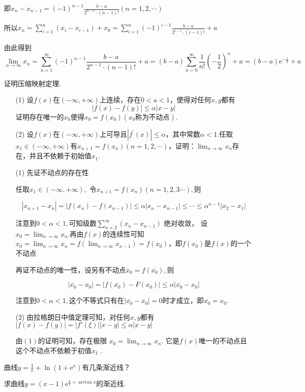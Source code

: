 \begin{xiti}
\begin{solution}
	即$x_{n}-x_{n-1}=(-1)^{n-1} \frac{b-a}{2^{n-1} \cdot(n-1) !}(n=1,2, \cdots)$
	
	所以$x_{n}=\sum_{i=1}^{n}\left(x_{i}-x_{i-1}\right)+x_{0}=\sum_{i=1}^{n}(-1)^{i-1} \frac{b-a}{2^{i-1} \cdot(i-1) !}+a$
	
	由此得到
	\[
	\lim _{n \rightarrow \infty} x_{n}=\sum_{n=1}^{\infty}(-1)^{n-1} \frac{b-a}{2^{n-1} \cdot(n-1) !}+a=(b-a) \sum_{n=0}^{\infty} \frac{1}{n !}\left(-\frac{1}{2}\right)^{n}+a=(b-a) \mathrm{e}^{-\frac{1}{2}}+a 
	\]
	
	
\end{solution}
\item 证明压缩映射定理.
\begin{enumerate}
	\item[(1)] 设$f(x)$在$(-\infty,+\infty)$上连续，存在$0<a<1$，使得对任何$x,y$都有
	\[| f ( x ) - f ( y ) | \leqslant \alpha | x - y |\]
	证明存在唯一的$x_{0}$使得$x_{0}=f(x_{0})(x_{0}\text{称为不动点})$.
	\item[(2)] 设$f(x)$在$(-\infty,+\infty)$上可导且$\left| f ^ { \prime } ( x ) \right| \leqslant \alpha$，其中常数$\alpha<1$.任取$x _ { 1 } \in ( - \infty , + \infty )$有$x _ { n + 1 } = f \left( x _ { n } \right) ( n = 1,2 , \cdots )$，证明：$\lim_{ n \rightarrow \infty }x_{n}$存在，并且不依赖于初始值$x_{1}$.
\end{enumerate}
\begin{solution}
	\begin{enumerate}
		\item[(1)] 先证不动点的存在性
		
		任取$x_1\in(-\infty,+\infty),$
		令$x_{n+1}=f(x_n)(n=1,2,3\cdots ),$则
		
		\[|x_{n+1}-x_n|=|f(x_n)-f(x_{n-1})| \leq \alpha |x_n-x_{n-1}|\leq \cdots \leq \alpha ^{n-1}|x_2-x_1|\]
		
		注意到$0<\alpha<1,$可知级数$ \sum_{n=2}^{\infty}(x_n-x_{n-1})$
		绝对收敛，
		设$x_0=\lim_{n \rightarrow \infty}x_n.$再由$f(x)$的连续性可知
		$x_0=\lim_{n \rightarrow \infty}x_n=f(\lim_{n \rightarrow \infty}x_{n-1})=f(x_0)$，即$f(x_0)$是$f(x)$的一个不动点
		
		 再证不动点的唯一性，设另有不动点$\overline x_0=f(\overline{x_0}),$则
		
		\[|\overline{x_0}-x_0|=|f(\overline{x_0})-F(x_0)|\leq \alpha |\overline{x_0}-x_0|\]
		
		注意到$0<\alpha<1,$这个不等式只有在$|\overline{x_0}-x_0|=0$时才成立，即$\overline{x_0}=x_0.$
		\item[(2)] 由拉格朗日中值定理可知，对任何$x,y$都有
		$|f(x)-f(y)|=|f'(\xi)||x-y|\leq \alpha|x-y|$
		
		由$(1)$的证明可知，存在极限
		$x_0=\lim_{n \rightarrow \infty}x_n.$
		它是$f(x)$唯一的不动点且这个不动点不依赖于初值$x_1$
		.
	\end{enumerate}
	
\end{solution}
\item 曲线$y = \frac { 1 } { x } + \ln \left( 1 + \mathrm { e } ^ { x } \right)$有几条渐近线？
\item 求曲线$y = ( x - 1 ) \mathrm { e } ^ { \frac { \pi } { 2 } + \arctan x }$的渐近线.
\end{xiti}
